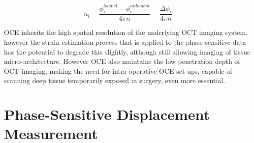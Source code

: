\begin{equation}
u_i = \frac{\phi_i^{loaded}-\phi_i^{unloaded}}{4\pi n} = \frac{\Delta\phi_i}{4\pi n}
\end{equation}

OCE inherits the high spatial resolution of the underlying OCT imaging system, however the strain estimation process that is applied to the phase-sensitive data has the potential to degrade this slightly, although still allowing imaging of tissue micro-architecture. However OCE also maintains the low penetration depth of OCT imaging, making the need for intra-operative OCE set ups, capable of scanning deep tissue temporarily exposed in surgery, even more essential. 

\section{Phase-Sensitive Displacement Measurement}\label{phase_sensitive}

